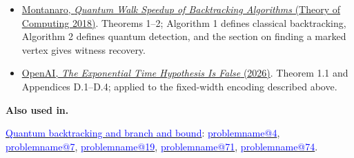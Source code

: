 \documentclass[11pt,a4paper]{article}
\makeatletter
\theoremstyle{problemstyle}
\newcommand{\subhead}[1]{\Needspace{4\baselineskip}\par\vspace{5pt}{\bfseries #1\par}\vspace{1pt}}
\newenvironment{algorithmindex}[1]{%
  \begin{itemize}[label=\textbullet,leftmargin=1.3em,labelsep=0.6em,itemsep=4pt,topsep=3pt,parsep=0pt]
  \small
}{\end{itemize}}
\newcommand{\problemref}[1]{\hyperref[entry:#1]{\textcolor{blue}{\csname problemname@#1\endcsname}}}
\newcommand{\algorithmref}[2]{\hyperref[algorithm:#1]{\textcolor{blue}{#2}}}
\makeatother
\begin{document}
\subhead{Algorithm: Montanaro's quantum backtracking}
\begin{algorithmindex}{3}
\item \href{https://arxiv.org/pdf/1509.02374}{Montanaro, \emph{Quantum Walk Speedup of Backtracking Algorithms} (Theory of Computing 2018)}. Theorems 1--2; Algorithm 1 defines classical backtracking, Algorithm 2 defines quantum detection, and the section on finding a marked vertex gives witness recovery.
\item \href{https://github.com/openai/math/blob/main/preprints/The-Exponential-Time-Hypothesis-is-False-October-25-2026/paper.pdf}{OpenAI, \emph{The Exponential Time Hypothesis Is False} (2026)}. Theorem 1.1 and Appendices D.1--D.4; applied to the fixed-width encoding described above.
\end{algorithmindex}
\par{}\begingroup\small
\textbf{Also used in.}
\par\algorithmref{backtracking}{Quantum backtracking and branch and bound}: \problemref{4}, \problemref{7}, \problemref{19}, \problemref{71}, \problemref{74}.
\par\endgroup
\end{document}
